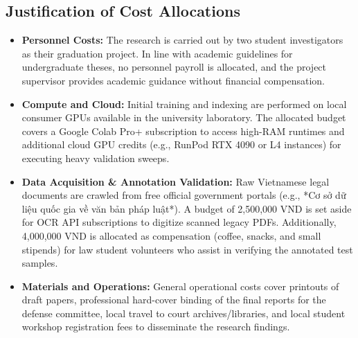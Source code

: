 \subsection{Justification of Cost Allocations}
\begin{itemize}
    \item \textbf{Personnel Costs:} The research is carried out by two student investigators as their graduation project. In line with academic guidelines for undergraduate theses, no personnel payroll is allocated, and the project supervisor provides academic guidance without financial compensation.
    \item \textbf{Compute and Cloud:} Initial training and indexing are performed on local consumer GPUs available in the university laboratory. The allocated budget covers a Google Colab Pro+ subscription to access high-RAM runtimes and additional cloud GPU credits (e.g., RunPod RTX 4090 or L4 instances) for executing heavy validation sweeps.
    \item \textbf{Data Acquisition \& Annotation Validation:} Raw Vietnamese legal documents are crawled from free official government portals (e.g., *Cơ sở dữ liệu quốc gia về văn bản pháp luật*). A budget of 2,500,000 VND is set aside for OCR API subscriptions to digitize scanned legacy PDFs. Additionally, 4,000,000 VND is allocated as compensation (coffee, snacks, and small stipends) for law student volunteers who assist in verifying the annotated test samples.
    \item \textbf{Materials and Operations:} General operational costs cover printouts of draft papers, professional hard-cover binding of the final reports for the defense committee, local travel to court archives/libraries, and local student workshop registration fees to disseminate the research findings.
\end{itemize}

